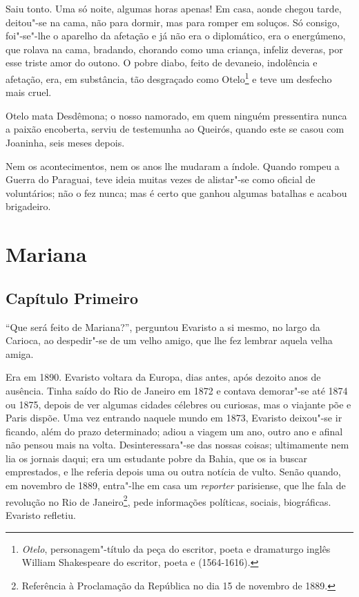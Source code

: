 Saiu tonto. Uma só noite, algumas horas apenas! Em casa, aonde chegou
tarde, deitou"-se na cama, não para dormir, mas para romper em soluços.
Só consigo, foi"-se"-lhe o aparelho da afetação e já não era o
diplomático, era o energúmeno, que rolava na cama, bradando, chorando
como uma criança, infeliz deveras, por esse triste amor do outono. O
pobre diabo, feito de devaneio, indolência e afetação, era, em
substância, tão desgraçado como Otelo\footnote{\emph{Otelo},
  personagem"-título da peça do escritor, poeta e dramaturgo inglês
  William Shakespeare do escritor, poeta e (1564-1616).} e teve um
desfecho mais cruel.

Otelo mata Desdêmona; o nosso namorado, em quem ninguém pressentira
nunca a paixão encoberta, serviu de testemunha ao Queirós, quando este
se casou com Joaninha, seis meses depois.

Nem os acontecimentos, nem os anos lhe mudaram a índole. Quando rompeu a
Guerra do Paraguai, teve ideia muitas vezes de alistar"-se como oficial
de voluntários; não o fez nunca; mas é certo que ganhou algumas batalhas
e acabou brigadeiro.

\chapter{Mariana}

\section{Capítulo Primeiro}

``Que será feito de Mariana?'', perguntou Evaristo a si mesmo, no largo
da Carioca, ao despedir"-se de um velho amigo, que lhe fez lembrar aquela
velha amiga.

Era em 1890. Evaristo voltara da Europa, dias antes, após dezoito anos
de ausência. Tinha saído do Rio de Janeiro em 1872 e contava demorar"-se
até 1874 ou 1875, depois de ver algumas cidades célebres ou curiosas,
mas o viajante põe e Paris dispõe. Uma vez entrando naquele mundo em
1873, Evaristo deixou"-se ir ficando, além do prazo determinado; adiou a
viagem um ano, outro ano e afinal não pensou mais na volta.
Desinteressara"-se das nossas coisas; ultimamente nem lia os jornais
daqui; era um estudante pobre da Bahia, que os ia buscar emprestados, e
lhe referia depois uma ou outra notícia de vulto. Senão quando, em
novembro de 1889, entra"-lhe em casa um \emph{reporter} parisiense, que
lhe fala de revolução no Rio de Janeiro\footnote{Referência à
  Proclamação da República no dia 15 de novembro de 1889.}, pede
informações políticas, sociais, biográficas. Evaristo refletiu.

